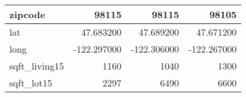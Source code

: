 \begin{table}[H]
\begin{tabular}{|l|r|r|r|}
\hline zipcode & \cellcolor[rgb]{0.9, 0.54, 0.52} 98115 & \cellcolor[rgb]{0.9, 0.54, 0.52} 98115 & 98105 \\
\hline lat & \cellcolor[rgb]{0.9, 0.54, 0.52} 47.683200 & 47.689200 & 47.671200 \\
\hline long & \cellcolor[rgb]{0.9, 0.54, 0.52} -122.297000 & \cellcolor[rgb]{0.9, 0.54, 0.52} -122.306000 & \cellcolor[rgb]{0.9, 0.54, 0.52} -122.267000 \\
\hline sqft\_living15 & \cellcolor[rgb]{0.9, 0.54, 0.52} 1160 & 1040 & 1300 \\
\hline sqft\_lot15 & \cellcolor[rgb]{0.9, 0.54, 0.52} 2297 & 6490 & 6600 \\
\hline
\end{tabular}
\end{table}
